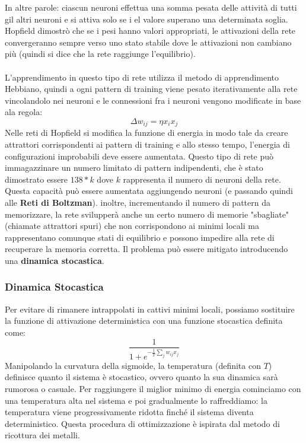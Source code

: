 In altre parole: ciascun neuroni effettua una somma pesata delle attività di tutti gil altri neuroni e si attiva solo se i el valore superano una determinata soglia.\\
Hopfield dimostrò che se i pesi hanno valori appropriati, le attivazioni della rete convergeranno sempre verso uno stato stabile dove le attivazioni non cambiano più (quindi si dice che la rete raggiunge l'equilibrio).\\
\\
L'apprendimento in questo tipo di rete utilizza il metodo di apprendimento Hebbiano, quindi a ogni pattern di training viene pesato iterativamente alla rete vincolandolo nei neuroni e le connessioni fra i neuroni vengono modificate in base ala regola:
\[\Delta w_{ij}=\eta x_ix_j\]
Nelle reti di Hopfield si modifica la funzione di energia in modo tale da creare attrattori corrispondenti ai pattern di training e allo stesso tempo, l'energia di configurazioni improbabili deve essere aumentata.
Questo tipo di rete può immagazzinare un numero limitato di pattern indipendenti, che è stato dimostrato essere \(138*k\) dove \(k\) rappresenta il numero di neuroni della rete. Questa capacità può essere aumentata aggiungendo neuroni (e passando quindi alle \textbf{Reti di Boltzman}). inoltre, incrementando il numero di pattern da memorizzare, la rete svilupperà anche un certo numero di memorie "sbagliate" (chiamate attrattori spuri) che non corrispondono ai minimi locali ma rappresentano comunque stati di equilibrio e possono impedire alla rete di recuperare la memoria corretta. Il problema può essere mitigato introducendo una \textbf{dinamica stocastica}.\\

\subsubsection{Dinamica Stocastica}
Per evitare di rimanere intrappolati in cattivi minimi locali, possiamo sostituire la funzione di attivazione deterministica con una funzione stocastica definita come:
\[\frac{1}{1+e^{-\frac{1}{T} \sum_j w_{ij}x_j}}\]
Manipolando la curvatura della sigmoide, la temperatura (definita con \(T\)) definisce quanto il sistema è stocastico, ovvero quanto la sua dinamica sarà rumorosa o casuale.
Per raggiungere il miglior minimo di energia cominciamo con una temperatura alta nel sistema e poi gradualmente lo raffreddiamo: la temperatura viene progressivamente ridotta finché il sistema diventa deterministico. Questa procedura di ottimizzazione è ispirata dal metodo di ricottura dei metalli. 

